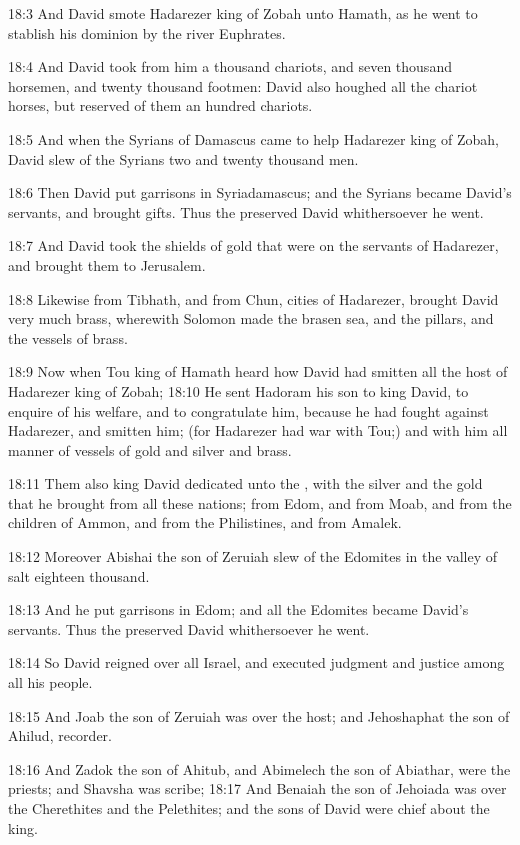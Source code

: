 18:3 And David smote Hadarezer king of Zobah unto Hamath, as he went
to stablish his dominion by the river Euphrates.

18:4 And David took from him a thousand chariots, and seven thousand
horsemen, and twenty thousand footmen: David also houghed all the
chariot horses, but reserved of them an hundred chariots.

18:5 And when the Syrians of Damascus came to help Hadarezer king of
Zobah, David slew of the Syrians two and twenty thousand men.

18:6 Then David put garrisons in Syriadamascus; and the Syrians became
David's servants, and brought gifts. Thus the \LORD preserved David
whithersoever he went.

18:7 And David took the shields of gold that were on the servants of
Hadarezer, and brought them to Jerusalem.

18:8 Likewise from Tibhath, and from Chun, cities of Hadarezer,
brought David very much brass, wherewith Solomon made the brasen sea,
and the pillars, and the vessels of brass.

18:9 Now when Tou king of Hamath heard how David had smitten all the
host of Hadarezer king of Zobah; 18:10 He sent Hadoram his son to king
David, to enquire of his welfare, and to congratulate him, because he
had fought against Hadarezer, and smitten him; (for Hadarezer had war
with Tou;) and with him all manner of vessels of gold and silver and
brass.

18:11 Them also king David dedicated unto the \LORD, with the silver
and the gold that he brought from all these nations; from Edom, and
from Moab, and from the children of Ammon, and from the Philistines,
and from Amalek.

18:12 Moreover Abishai the son of Zeruiah slew of the Edomites in the
valley of salt eighteen thousand.

18:13 And he put garrisons in Edom; and all the Edomites became
David's servants. Thus the \LORD preserved David whithersoever he went.

18:14 So David reigned over all Israel, and executed judgment and
justice among all his people.

18:15 And Joab the son of Zeruiah was over the host; and Jehoshaphat
the son of Ahilud, recorder.

18:16 And Zadok the son of Ahitub, and Abimelech the son of Abiathar,
were the priests; and Shavsha was scribe; 18:17 And Benaiah the son of
Jehoiada was over the Cherethites and the Pelethites; and the sons of
David were chief about the king.


